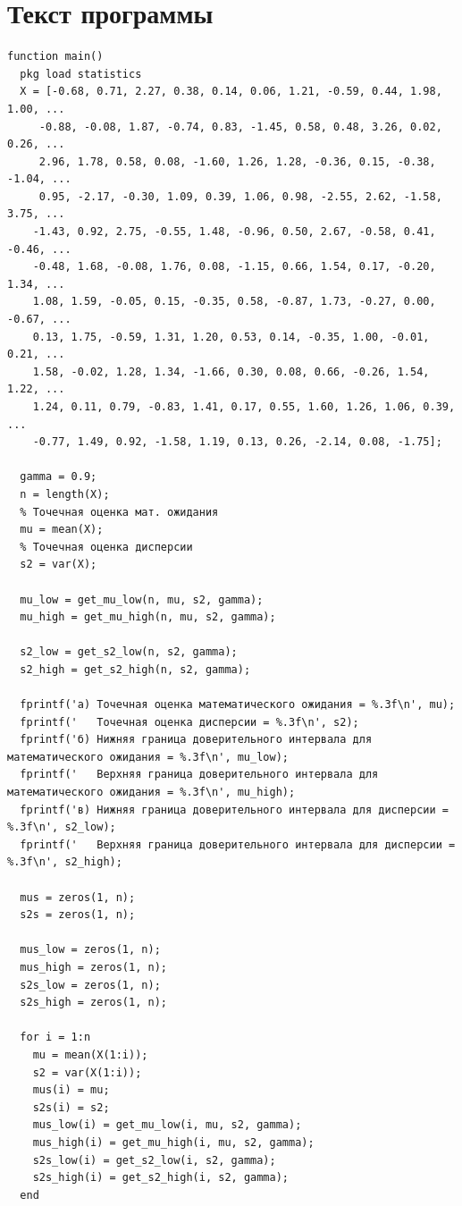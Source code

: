 \chapter{Текст программы} 
\begin{lstlisting}
function main()
  pkg load statistics
  X = [-0.68, 0.71, 2.27, 0.38, 0.14, 0.06, 1.21, -0.59, 0.44, 1.98, 1.00, ...
     -0.88, -0.08, 1.87, -0.74, 0.83, -1.45, 0.58, 0.48, 3.26, 0.02, 0.26, ...
     2.96, 1.78, 0.58, 0.08, -1.60, 1.26, 1.28, -0.36, 0.15, -0.38, -1.04, ...
     0.95, -2.17, -0.30, 1.09, 0.39, 1.06, 0.98, -2.55, 2.62, -1.58, 3.75, ...
    -1.43, 0.92, 2.75, -0.55, 1.48, -0.96, 0.50, 2.67, -0.58, 0.41, -0.46, ...
    -0.48, 1.68, -0.08, 1.76, 0.08, -1.15, 0.66, 1.54, 0.17, -0.20, 1.34, ...
    1.08, 1.59, -0.05, 0.15, -0.35, 0.58, -0.87, 1.73, -0.27, 0.00, -0.67, ...
    0.13, 1.75, -0.59, 1.31, 1.20, 0.53, 0.14, -0.35, 1.00, -0.01, 0.21, ...
    1.58, -0.02, 1.28, 1.34, -1.66, 0.30, 0.08, 0.66, -0.26, 1.54, 1.22, ...
    1.24, 0.11, 0.79, -0.83, 1.41, 0.17, 0.55, 1.60, 1.26, 1.06, 0.39, ...
    -0.77, 1.49, 0.92, -1.58, 1.19, 0.13, 0.26, -2.14, 0.08, -1.75];

  gamma = 0.9;
  n = length(X);
  % Точечная оценка мат. ожидания
  mu = mean(X);
  % Точечная оценка дисперсии
  s2 = var(X);

  mu_low = get_mu_low(n, mu, s2, gamma);
  mu_high = get_mu_high(n, mu, s2, gamma);

  s2_low = get_s2_low(n, s2, gamma);
  s2_high = get_s2_high(n, s2, gamma);

  fprintf('a) Точечная оценка математического ожидания = %.3f\n', mu);
  fprintf('   Точечная оценка дисперсии = %.3f\n', s2);
  fprintf('б) Нижняя граница доверительного интервала для математического ожидания = %.3f\n', mu_low);
  fprintf('   Верхняя граница доверительного интервала для математического ожидания = %.3f\n', mu_high);
  fprintf('в) Нижняя граница доверительного интервала для дисперсии = %.3f\n', s2_low);
  fprintf('   Верхняя граница доверительного интервала для дисперсии = %.3f\n', s2_high);

  mus = zeros(1, n);
  s2s = zeros(1, n);

  mus_low = zeros(1, n);
  mus_high = zeros(1, n);
  s2s_low = zeros(1, n);
  s2s_high = zeros(1, n);

  for i = 1:n
    mu = mean(X(1:i));
    s2 = var(X(1:i));
    mus(i) = mu;
    s2s(i) = s2;
    mus_low(i) = get_mu_low(i, mu, s2, gamma);
    mus_high(i) = get_mu_high(i, mu, s2, gamma);
    s2s_low(i) = get_s2_low(i, s2, gamma);
    s2s_high(i) = get_s2_high(i, s2, gamma);
  end


\end{lstlisting}

